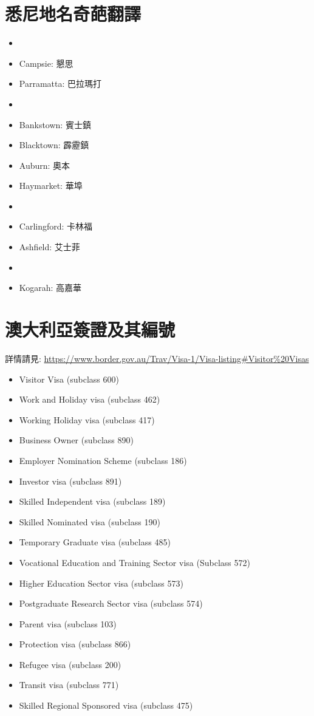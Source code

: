\section{悉尼地名奇葩翻譯}
\begin{multicols}{3}
\begin{itemize}
  \itemsep0em
  \item {}
  \item Campsie: 懇思
  \item Parramatta: 巴拉瑪打
  \item {}
  \item Bankstown: 賓士鎮
  \item Blacktown: 霹靂鎮
  \item Auburn: 奧本
  \item Haymarket: 華埠
  \item {}
  \item Carlingford: 卡林福
  \item Ashfield: 艾士菲
  \item {}
  \item Kogarah: 高嘉華
\end{itemize}
\end{multicols}

\section{澳大利亞簽證及其編號}
詳情請見: \url{https://www.border.gov.au/Trav/Visa-1/Visa-listing#Visitor%20Visas}
\begin{itemize}
  \itemsep0em
  \item Visitor Visa (subclass 600)
  \item Work and Holiday visa (subclass 462)
  \item Working Holiday visa (subclass 417)
  \item Business Owner (subclass 890)
  \item Employer Nomination Scheme (subclass 186)
  \item Investor visa (subclass 891)
  \item Skilled Independent visa (subclass 189)
  \item Skilled Nominated visa (subclass 190)
  \item Temporary Graduate visa (subclass 485)
  \item Vocational Education and Training Sector visa (Subclass 572)
  \item Higher Education Sector visa (subclass 573)
  \item Postgraduate Research Sector visa (subclass 574)
  \item Parent visa (subclass 103)
  \item Protection visa (subclass 866)
  \item Refugee visa (subclass 200)
  \item Transit visa (subclass 771)
  \item Skilled Regional Sponsored visa (subclass 475)
\end{itemize}
